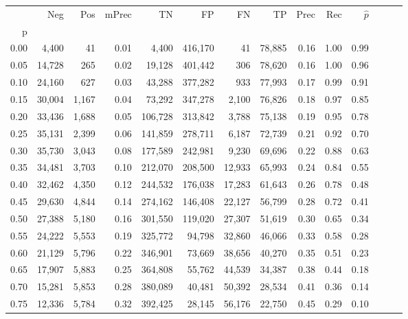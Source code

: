 \begin{tabular}{rrrrrrrrrrrrrr}
\toprule
{} &     Neg &    Pos & mPrec &       TN &       FP &      FN &      TP &  Prec &   Rec & $\hat{p}$ \\
p    &         &        &       &          &          &         &         &       &       &           \\
\midrule
0.00 &   4,400 &     41 &  0.01 &    4,400 &  416,170 &      41 &  78,885 &  0.16 &  1.00 &      0.99 \\
0.05 &  14,728 &    265 &  0.02 &   19,128 &  401,442 &     306 &  78,620 &  0.16 &  1.00 &      0.96 \\
0.10 &  24,160 &    627 &  0.03 &   43,288 &  377,282 &     933 &  77,993 &  0.17 &  0.99 &      0.91 \\
0.15 &  30,004 &  1,167 &  0.04 &   73,292 &  347,278 &   2,100 &  76,826 &  0.18 &  0.97 &      0.85 \\
0.20 &  33,436 &  1,688 &  0.05 &  106,728 &  313,842 &   3,788 &  75,138 &  0.19 &  0.95 &      0.78 \\
0.25 &  35,131 &  2,399 &  0.06 &  141,859 &  278,711 &   6,187 &  72,739 &  0.21 &  0.92 &      0.70 \\
0.30 &  35,730 &  3,043 &  0.08 &  177,589 &  242,981 &   9,230 &  69,696 &  0.22 &  0.88 &      0.63 \\
0.35 &  34,481 &  3,703 &  0.10 &  212,070 &  208,500 &  12,933 &  65,993 &  0.24 &  0.84 &      0.55 \\
0.40 &  32,462 &  4,350 &  0.12 &  244,532 &  176,038 &  17,283 &  61,643 &  0.26 &  0.78 &      0.48 \\
0.45 &  29,630 &  4,844 &  0.14 &  274,162 &  146,408 &  22,127 &  56,799 &  0.28 &  0.72 &      0.41 \\
0.50 &  27,388 &  5,180 &  0.16 &  301,550 &  119,020 &  27,307 &  51,619 &  0.30 &  0.65 &      0.34 \\
0.55 &  24,222 &  5,553 &  0.19 &  325,772 &   94,798 &  32,860 &  46,066 &  0.33 &  0.58 &      0.28 \\
0.60 &  21,129 &  5,796 &  0.22 &  346,901 &   73,669 &  38,656 &  40,270 &  0.35 &  0.51 &      0.23 \\
0.65 &  17,907 &  5,883 &  0.25 &  364,808 &   55,762 &  44,539 &  34,387 &  0.38 &  0.44 &      0.18 \\
0.70 &  15,281 &  5,853 &  0.28 &  380,089 &   40,481 &  50,392 &  28,534 &  0.41 &  0.36 &      0.14 \\
0.75 &  12,336 &  5,784 &  0.32 &  392,425 &   28,145 &  56,176 &  22,750 &  0.45 &  0.29 &      0.10 \\

\end{tabular}
